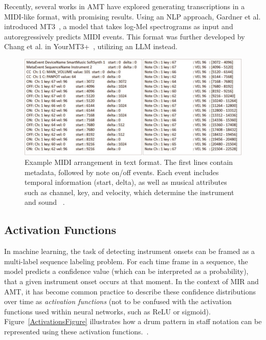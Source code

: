 Recently, several works in \gls{AMT} have explored generating transcriptions in a \gls{MIDI}-like format, with promising results. Using an \acrshort{NLP} approach, Gardner et al. introduced MT3~\cite{gardner2022mt3multitaskmultitrackmusic}, a model that takes log-Mel spectrograms as input and autoregressively predicts \gls{MIDI} events. This format was further developed by Chang et al. in YourMT3+~\cite{chang2024yourmt3+}, utilizing an \acrshort{LLM} instead.

\begin{figure}[H]
    \centering
    \includegraphics[scale=0.65, trim={0 0 13.8cm 0},clip]{figures/midi}
    \caption{Example MIDI arrangement in text format. The first lines contain metadata, followed by note on/off events. Each event includes temporal information (start, delta), as well as musical attributes such as channel, key, and velocity, which determine the instrument and sound ~\cite{starostenko2019}.}
    \label{MIDIFigure}
\end{figure}

\subsection{Activation Functions}

In machine learning, the task of detecting instrument onsets can be framed as a multi-label sequence labeling problem. For each time frame in a sequence, the model predicts a confidence value (which can be interpreted as a probability), that a given instrument onset occurs at that moment. In the context of \gls{MIR} and \gls{AMT}, it has become common practice to describe these confidence distributions over time as \textit{activation functions} (not to be confused with the activation functions used within neural networks, such as \acrshort{ReLU} or sigmoid). Figure~\ref{ActivationsFigure} illustrates how a drum pattern in staff notation can be represented using these activation functions.~\cite{schluter2014improved, bock2016joint, Southall2016AutomaticDT, 8350302, vogl2018multiinstrumentdrumtranscription}.

